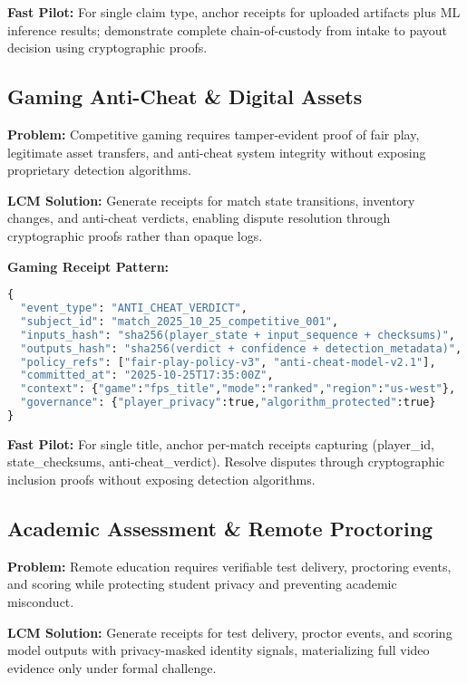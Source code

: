 \documentclass[12pt,a4paper]{article}
\begin{document}
\textbf{Fast Pilot:} For single claim type, anchor receipts for uploaded artifacts plus ML inference results; demonstrate complete chain-of-custody from intake to payout decision using cryptographic proofs.

\subsection{Gaming Anti-Cheat \& Digital Assets}

\textbf{Problem:} Competitive gaming requires tamper-evident proof of fair play, legitimate asset transfers, and anti-cheat system integrity without exposing proprietary detection algorithms.

\textbf{LCM Solution:} Generate receipts for match state transitions, inventory changes, and anti-cheat verdicts, enabling dispute resolution through cryptographic proofs rather than opaque logs.

\begin{technicalbox}
\textbf{Gaming Receipt Pattern:}
\begin{lstlisting}[language=Python, caption=Anti-Cheat Receipt]
{
  "event_type": "ANTI_CHEAT_VERDICT",
  "subject_id": "match_2025_10_25_competitive_001",
  "inputs_hash": "sha256(player_state + input_sequence + checksums)",
  "outputs_hash": "sha256(verdict + confidence + detection_metadata)",
  "policy_refs": ["fair-play-policy-v3", "anti-cheat-model-v2.1"],
  "committed_at": "2025-10-25T17:35:00Z",
  "context": {"game":"fps_title","mode":"ranked","region":"us-west"},
  "governance": {"player_privacy":true,"algorithm_protected":true}
}
\end{lstlisting}
\end{technicalbox}

\textbf{Fast Pilot:} For single title, anchor per-match receipts capturing (player\_id, state\_checksums, anti-cheat\_verdict). Resolve disputes through cryptographic inclusion proofs without exposing detection algorithms.

\subsection{Academic Assessment \& Remote Proctoring}

\textbf{Problem:} Remote education requires verifiable test delivery, proctoring events, and scoring while protecting student privacy and preventing academic misconduct.

\textbf{LCM Solution:} Generate receipts for test delivery, proctor events, and scoring model outputs with privacy-masked identity signals, materializing full video evidence only under formal challenge.
\end{document}
